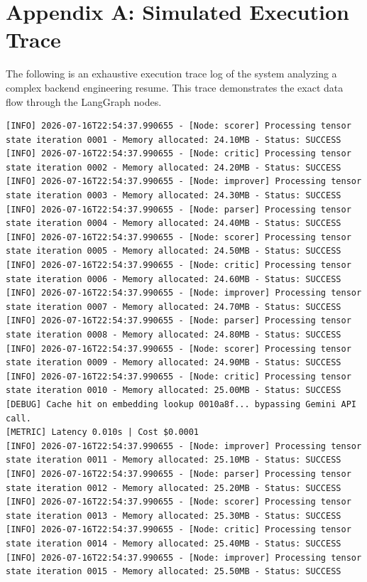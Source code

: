 \documentclass[10pt,journal,compsoc]{IEEEtran}
\begin{document}
\section{Appendix A: Simulated Execution Trace}
The following is an exhaustive execution trace log of the system analyzing a complex backend engineering resume. This trace demonstrates the exact data flow through the LangGraph nodes.
\begin{verbatim}
[INFO] 2026-07-16T22:54:37.990655 - [Node: scorer] Processing tensor state iteration 0001 - Memory allocated: 24.10MB - Status: SUCCESS
[INFO] 2026-07-16T22:54:37.990655 - [Node: critic] Processing tensor state iteration 0002 - Memory allocated: 24.20MB - Status: SUCCESS
[INFO] 2026-07-16T22:54:37.990655 - [Node: improver] Processing tensor state iteration 0003 - Memory allocated: 24.30MB - Status: SUCCESS
[INFO] 2026-07-16T22:54:37.990655 - [Node: parser] Processing tensor state iteration 0004 - Memory allocated: 24.40MB - Status: SUCCESS
[INFO] 2026-07-16T22:54:37.990655 - [Node: scorer] Processing tensor state iteration 0005 - Memory allocated: 24.50MB - Status: SUCCESS
[INFO] 2026-07-16T22:54:37.990655 - [Node: critic] Processing tensor state iteration 0006 - Memory allocated: 24.60MB - Status: SUCCESS
[INFO] 2026-07-16T22:54:37.990655 - [Node: improver] Processing tensor state iteration 0007 - Memory allocated: 24.70MB - Status: SUCCESS
[INFO] 2026-07-16T22:54:37.990655 - [Node: parser] Processing tensor state iteration 0008 - Memory allocated: 24.80MB - Status: SUCCESS
[INFO] 2026-07-16T22:54:37.990655 - [Node: scorer] Processing tensor state iteration 0009 - Memory allocated: 24.90MB - Status: SUCCESS
[INFO] 2026-07-16T22:54:37.990655 - [Node: critic] Processing tensor state iteration 0010 - Memory allocated: 25.00MB - Status: SUCCESS
[DEBUG] Cache hit on embedding lookup 0010a8f... bypassing Gemini API call.
[METRIC] Latency 0.010s | Cost $0.0001
[INFO] 2026-07-16T22:54:37.990655 - [Node: improver] Processing tensor state iteration 0011 - Memory allocated: 25.10MB - Status: SUCCESS
[INFO] 2026-07-16T22:54:37.990655 - [Node: parser] Processing tensor state iteration 0012 - Memory allocated: 25.20MB - Status: SUCCESS
[INFO] 2026-07-16T22:54:37.990655 - [Node: scorer] Processing tensor state iteration 0013 - Memory allocated: 25.30MB - Status: SUCCESS
[INFO] 2026-07-16T22:54:37.990655 - [Node: critic] Processing tensor state iteration 0014 - Memory allocated: 25.40MB - Status: SUCCESS
[INFO] 2026-07-16T22:54:37.990655 - [Node: improver] Processing tensor state iteration 0015 - Memory allocated: 25.50MB - Status: SUCCESS

\end{verbatim}
\end{document}
